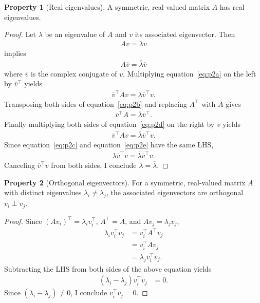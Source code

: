 \documentclass[]{article}
\theoremstyle{plain}
\theoremstyle{definition}
\newtheorem{property}{Property}
\theoremstyle{remark}
\begin{document}
\begin{property}[Real eigenvalues]
A symmetric, real-valued matrix $A$ has real eigenvalues.
\end{property}
\begin{proof}
Let $\lambda$ be an eigenvalue of $A$ and $v$ its associated eigenvector.
Then
\begin{align}\label{eq:p2a}
Av = \lambda v
\end{align}
implies
\begin{align}\label{eq:p2b}
A\overline{v} = \overline{\lambda} \overline{v}
\end{align}
where $\overline{v}$ is the complex conjugate of $v$.
Multiplying equation~\ref{eq:p2a} on the left by $\overline{v}^\top$ yields
\begin{align}\label{eq:p2c}
\overline{v}^\top Av = \lambda \overline{v}^\top v.
\end{align}
Transposing both sides of equation~\ref{eq:p2b} and replacing $A^\top$ with $A$ gives
\begin{align}\label{eq:p2d}
\overline{v}^\top A = \overline{\lambda} \overline{v}^\top.
\end{align}
Finally multiplying both sides of equation~\ref{eq:p2d} on the right by $v$ yields
\begin{align}\label{eq:p2e}
\overline{v}^\top Av  = \overline{\lambda} \overline{v}^\top v.
\end{align}
Since equation~\ref{eq:p2c} and equation~\ref{eq:p2e} have the same LHS,
\begin{align*}
\lambda \overline{v}^\top v = \overline{\lambda} \overline{v}^\top v.
\end{align*}
Canceling $\overline{v}^\top v$ from both sides, I conclude
$\lambda = \overline{\lambda}$.
\end{proof}

\begin{property}[Orthogonal eigenvectors]
For a symmetric, real-valued matrix $A$ with distinct eigenvalues
$\lambda_i \ne \lambda_j$, the associated eigenvectors are orthogonal
$v_i \perp v_j$.
\end{property}
\begin{proof}
Since $(Av_i)^\top = \lambda_i v_i^\top$, $A^\top = A$, and $Av_j = \lambda_j v_j$,
\begin{align*}
\lambda_i v_i^\top v_j &= v_i^\top A^\top v_j \\
   &= v_i^\top Av_j \\
   &= \lambda_j v_i^\top v_j.
\end{align*}
Subtracting the LHS from both sides of the above equation yields
\begin{align*}
(\lambda_i - \lambda_j) v_i^\top v_j &= 0.
\end{align*}
Since $(\lambda_i - \lambda_j) \ne 0$, I conclude $v_i^\top v_j = 0$.
\end{proof}
\end{document}
